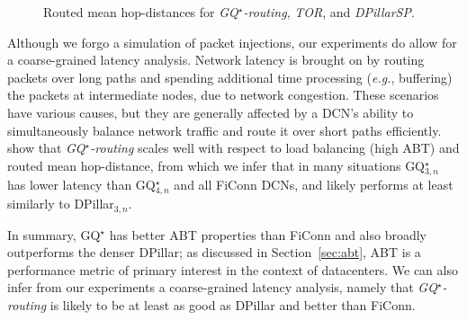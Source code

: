 \documentclass[]{amsart}
\newcommand{\tor}{\textit{TOR}}
\begin{document}
{\begin{figure}[ht]
{

}
\caption{Routed mean hop-distances for \emph{GQ$^\star$-routing\/},
  \tor, and \emph{DPillarSP\/}.}
\label{plot:servers_vs_hops_fixed_KP_0.0}
\end{figure}







Although we forgo a simulation of packet injections, our experiments do allow for a coarse-grained latency analysis.  Network latency is
brought on by routing packets over long paths and spending additional
time processing (\emph{e.g.\/}, buffering) the packets at intermediate nodes,
due to network congestion.  These scenarios have various causes, but
they are generally affected by a DCN's ability to simultaneously
balance network traffic and route it over short paths efficiently.
show that \emph{GQ$^\star$-routing\/} scales well with respect to load balancing
(high ABT) and routed mean hop-distance, from which we infer that in
many situations GQ$^\star_{3,n}$ has lower latency than GQ$^\star_{4,n}$ and all FiConn DCNs, and likely performs at least similarly to DPillar$_{3,n}$.

In summary, GQ$^\star$ has better ABT properties than FiConn and also broadly outperforms the denser
DPillar; as discussed in Section~\ref{sec:abt}, ABT is a performance metric of primary interest in
the context of datacenters. We can also infer from our experiments a coarse-grained latency analysis, namely that \emph{GQ$^\star$-routing\/} is likely to be at least as good as DPillar and better than FiConn.



}
\end{document}
